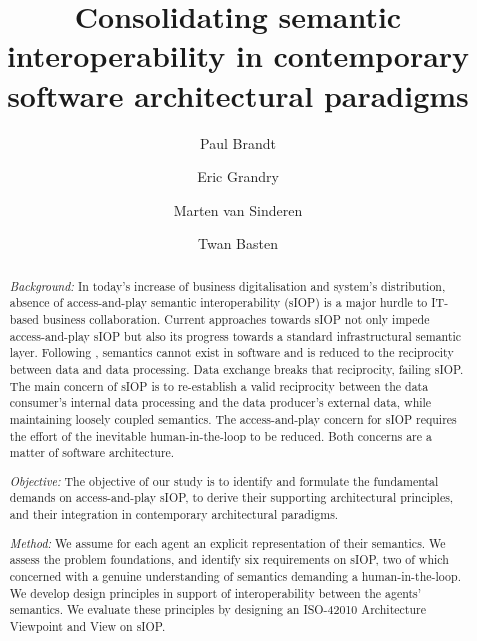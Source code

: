 \documentclass[sort&compress,preprint,authoryear,3p,twocolumn]{elsarticle}
\begin{document}
\begin{frontmatter}

  \title{Consolidating semantic interoperability in contemporary
software architectural paradigms}

\author[1]{Paul
Brandt} \author[2]{Eric
Grandry} \author[3]{Marten van
Sinderen} \author[1]{Twan
Basten}

   

\begin{abstract}
\emph{Background:} In today's increase of business digitalisation and
system's distribution, absence of access-and-play semantic
interoperability (sIOP) is a major hurdle to IT-based business
collaboration. Current approaches towards sIOP not only impede
access-and-play sIOP but also its progress towards a standard
infrastructural semantic layer. Following \citep{Brandt2021a}, semantics
cannot exist in software and is reduced to the reciprocity between data
and data processing. Data exchange breaks that reciprocity, failing
sIOP. The main concern of sIOP is to re-establish a valid reciprocity
between the data consumer's internal data processing and the data
producer's external data, while maintaining loosely coupled semantics.
The access-and-play concern for sIOP requires the effort of the
inevitable human-in-the-loop to be reduced. Both concerns are a matter
of software architecture.

\emph{Objective:} The objective of our study is to identify and
formulate the fundamental demands on access-and-play sIOP, to derive
their supporting architectural principles, and their integration in
contemporary architectural paradigms.

\emph{Method:} We assume for each agent an explicit representation of
their semantics. We assess the problem foundations, and identify six
requirements on sIOP, two of which concerned with a genuine
understanding of semantics demanding a human-in-the-loop. We develop
design principles in support of interoperability between the agents'
semantics. We evaluate these principles by designing an ISO-42010
Architecture Viewpoint and View on sIOP.


\end{abstract}
\end{frontmatter}
\end{document}
